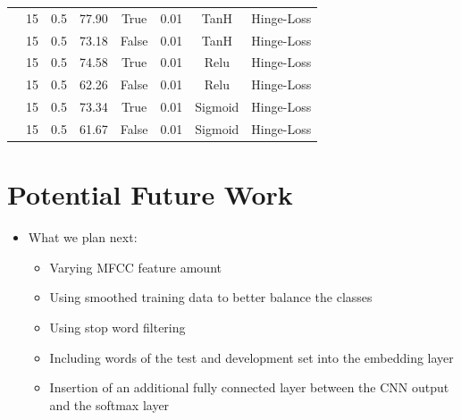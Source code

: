 \documentclass[a0,landscape]{a0poster}
\begin{document}
\begin{multicols}{3}
\begin{center}
\begin{tabular}{c | c |c | c | c | c | c | c }
		\hline
		\hline
		{\multirow{6}{*}{\rotatebox[origin=c]{90}{Acolex}}} & \cellcolor{lightgreen}15 & \cellcolor{lightgreen}0.5 & \cellcolor{lightgreen}77.90 & \cellcolor{lightgreen}True & \cellcolor{lightgreen}0.01 & \cellcolor{lightgreen}TanH & \cellcolor{lightgreen}Hinge-Loss\\
		& 15 & 0.5 & 73.18 & False & 0.01 & TanH & Hinge-Loss\\
		& \cellcolor{lightgreen}15 & \cellcolor{lightgreen}0.5 & \cellcolor{lightgreen}74.58 & \cellcolor{lightgreen}True & \cellcolor{lightgreen}0.01 & \cellcolor{lightgreen}Relu & \cellcolor{lightgreen}Hinge-Loss\\
		& 15 & 0.5 & 62.26 & False & 0.01 & Relu & Hinge-Loss\\
		& \cellcolor{lightgreen}15 & \cellcolor{lightgreen}0.5 & \cellcolor{lightgreen}73.34 & \cellcolor{lightgreen}True & \cellcolor{lightgreen}0.01 & \cellcolor{lightgreen}Sigmoid & \cellcolor{lightgreen}Hinge-Loss\\
		& 15 & 0.5 & 61.67 & False & 0.01 & Sigmoid & Hinge-Loss\\
	
	\end{tabular}
\end{center}
\color{Black} %
\large

\section*{Potential Future Work}

\begin{itemize}
	\item What we plan next:
	\begin{itemize}
		\item Varying MFCC feature amount
		\item Using smoothed training data to better balance the classes
		\item Using stop word filtering 
		\item Including words of the test and development set into the embedding layer
		\item Insertion of an additional fully connected layer between the CNN output and the softmax layer
	

\end{itemize}
\end{itemize}
\end{multicols}
\end{document}
